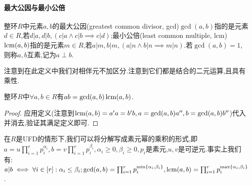 \documentclass[openany]{book}
\begin{document}
\paragraph{最大公因与最小公倍}
\begin{definition}
    整环$R$中元素$a,b$的最大公因(greatest common divisor, gcd)$\gcd(a,b)$指的是元素$d\in R$,若$d|a,d|b,(c|a\land c|b\implies c|d)$;最小公倍(least common multiple, lcm)$\operatorname{lcm}(a,b)$指的是元素$m\in R$,若$a|m,b|m,(a|n\land b|n\implies m|n)$.若$\gcd(a,b)=1$,则称$a,b$互素,记为$a\perp b$.
\end{definition}
注意到在此定义中我们对相伴元不加区分.注意到它们都是结合的二元运算,且具有乘性.
\begin{theorem}
    整环$R$中$\forall a,b\in R$有$ab=\gcd(a,b)\operatorname{lcm}(a,b)$.
\end{theorem}
\begin{proof}
    应用定义(注意到$\operatorname{lcm}(a,b)=a'a=b'b,a=\gcd(a,b)a'',b=\gcd(a,b)b''$)代入并消去,验证其满足定义即可.
\end{proof}
在$R$是UFD的情形下,我们可以将分解写成素元幂的乘积的形式,即$a=u\prod_{i=1}^r p_i^{\alpha_i}, b=v\prod_{i=1}^r p_i^{\beta_i}, \alpha_i\geq 0, \beta_i\geq 0, p_i$是素元,$u,v$是可逆元.事实上我们有:$a|b\iff \forall i\in [r]:\alpha_i\leq \beta_i; \gcd(a,b)=\prod_{i=1}^r p_i^{\min\left\{\alpha_i,\beta_i\right\}}, \operatorname{lcm}(a,b)=\prod_{i=1}^r p_i^{\max\left\{\alpha_i,\beta_i\right\}}$.
\end{document}
